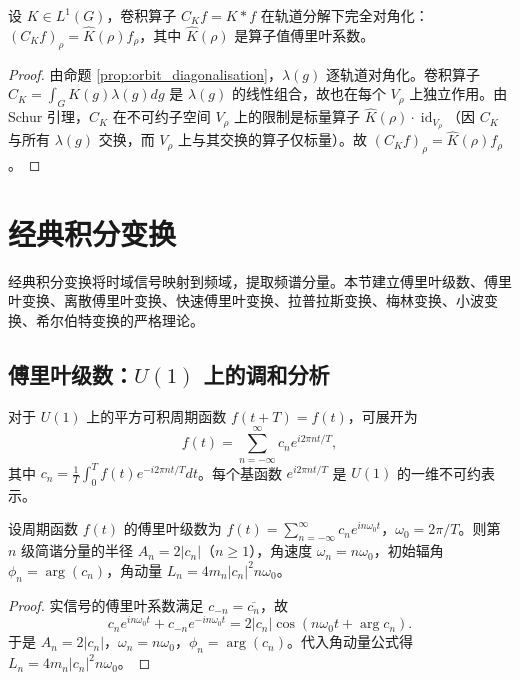 \begin{corollary}[卷积算子的轨道分解]\label{cor:convolution_orbit_decomp}
设 $K \in L^1(G)$，卷积算子 $C_K f = K * f$ 在轨道分解下完全对角化：$(C_K f)_\rho = \hat{K}(\rho) f_\rho$，其中 $\hat{K}(\rho)$ 是算子值傅里叶系数。
\end{corollary}

\begin{proof}
由命题 \ref{prop:orbit_diagonalisation}，$\lambda(g)$ 逐轨道对角化。卷积算子 $C_K = \int_G K(g) \lambda(g) dg$ 是 $\lambda(g)$ 的线性组合，故也在每个 $V_\rho$ 上独立作用。由 Schur 引理，$C_K$ 在不可约子空间 $V_\rho$ 上的限制是标量算子 $\hat{K}(\rho) \cdot \operatorname{id}_{V_\rho}$（因 $C_K$ 与所有 $\lambda(g)$ 交换，而 $V_\rho$ 上与其交换的算子仅标量）。故 $(C_K f)_\rho = \hat{K}(\rho) f_\rho$。
\end{proof}

\section{\texorpdfstring{经典积分变换}{经典积分变换}}

经典积分变换将时域信号映射到频域，提取频谱分量。本节建立傅里叶级数、傅里叶变换、离散傅里叶变换、快速傅里叶变换、拉普拉斯变换、梅林变换、小波变换、希尔伯特变换的严格理论。

\subsection{\texorpdfstring{傅里叶级数：$U(1)$ 上的调和分析}{傅里叶级数}}

\begin{definition}[傅里叶级数]\label{def:fourier_series}
对于 $U(1)$ 上的平方可积周期函数 $f(t+T)=f(t)$，可展开为
\[f(t) = \sum_{n=-\infty}^{\infty} c_n e^{i 2\pi n t / T},\]
其中 $c_n = \frac{1}{T} \int_0^T f(t) e^{-i 2\pi n t / T} dt$。每个基函数 $e^{i 2\pi n t / T}$ 是 $U(1)$ 的一维不可约表示。
\end{definition}

\begin{proposition}[傅里叶系数与简谐分量参数的关系]\label{prop:fourier_epicycle}
设周期函数 $f(t)$ 的傅里叶级数为 $f(t) = \sum_{n=-\infty}^{\infty} c_n e^{i n \omega_0 t}$，$\omega_0 = 2\pi/T$。则第 $n$ 级简谐分量的半径 $A_n = 2|c_n|$（$n \ge 1$），角速度 $\omega_n = n\omega_0$，初始辐角 $\phi_n = \arg(c_n)$，角动量 $L_n = 4m_n |c_n|^2 n\omega_0$。
\end{proposition}

\begin{proof}
实信号的傅里叶系数满足 $c_{-n} = \overline{c_n}$，故
\[
c_n e^{in\omega_0 t} + c_{-n} e^{-in\omega_0 t} = 2|c_n| \cos(n\omega_0 t + \arg c_n).
\]
于是 $A_n = 2|c_n|$，$\omega_n = n\omega_0$，$\phi_n = \arg(c_n)$。代入角动量公式得 $L_n = 4m_n |c_n|^2 n\omega_0$。
\end{proof}

